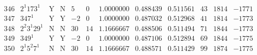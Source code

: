 \documentclass[11pt,reqno,a4letter]{article}
\numberwithin{figure}{section}
\numberwithin{table}{section}
\theoremstyle{plain}
\numberwithin{theorem}{section}
\theoremstyle{definition}
\begin{document}
\begin{table}[ht]
\begin{equation*}
{\begin{array}{cc|cc|ccc|cc|ccc}
 346 & 2^1 173^1 & \text{Y} & \text{N} & 5 & 0 & 1.0000000 & 0.488439 & 0.511561 & 43 & 1814 & -1771 \\
 347 & 347^1 & \text{Y} & \text{Y} & -2 & 0 & 1.0000000 & 0.487032 & 0.512968 & 41 & 1814 & -1773 \\
 348 & 2^2 3^1 29^1 & \text{N} & \text{N} & 30 & 14 & 1.1666667 & 0.488506 & 0.511494 & 71 & 1844 & -1773 \\
 349 & 349^1 & \text{Y} & \text{Y} & -2 & 0 & 1.0000000 & 0.487106 & 0.512894 & 69 & 1844 & -1775 \\
 350 & 2^1 5^2 7^1 & \text{N} & \text{N} & 30 & 14 & 1.1666667 & 0.488571 & 0.511429 & 99 & 1874 & -1775 \\ 
\end{array}
}
\end{equation*}
\clearpage 

\end{table} 
\end{document}

